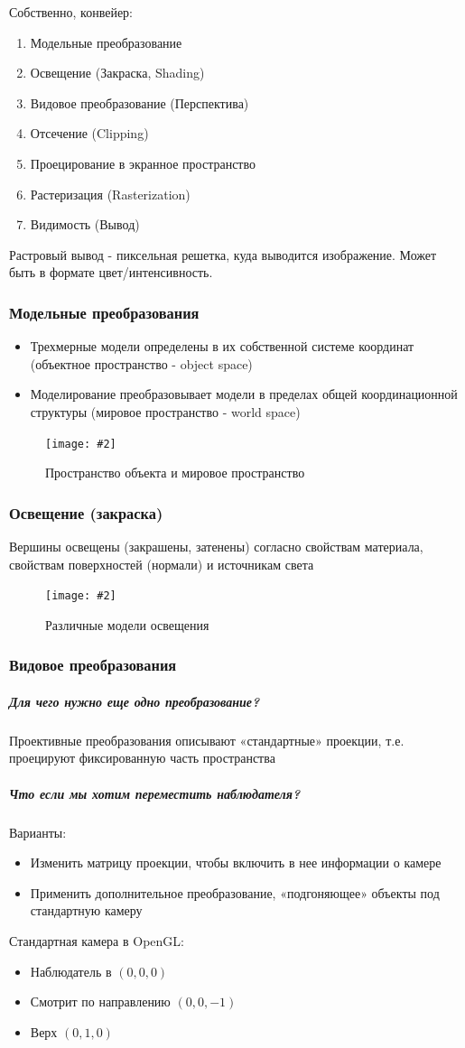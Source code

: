 \documentclass[a4paper, 14pt]{extarticle}
\newcommand{\screenshot}[3]{
	\begin{figure}[h]
		\centering
		\texttt{[image: \#2]}
		\caption{#3}
	\end{figure}
}
\begin{document}
Собственно, конвейер:
\begin{enumerate}
	\item Модельные преобразование
	\item Освещение (Закраска, Shading)
	\item Видовое преобразование (Перспектива)
	\item Отсечение (Clipping)
	\item Проецирование в экранное пространство
	\item Растеризация (Rasterization)
	\item Видимость (Вывод)
\end{enumerate}

Растровый вывод - пиксельная решетка, куда выводится изображение. Может быть в формате цвет/интенсивность.

\subsubsection{Модельные преобразования}
\begin{itemize}
	\item Трехмерные модели определены в их собственной системе координат (объектное пространство - object space)
	\item Моделирование преобразовывает модели в пределах общей координационной структуры (мировое пространство - world space)
\end{itemize}
\screenshot{width=\textwidth}{l5/S028.jpg}{Пространство объекта и мировое пространство}

\subsubsection{Освещение (закраска)}
Вершины освещены (закрашены, затенены) согласно свойствам материала, свойствам поверхностей (нормали) и источникам света
\screenshot{width=9cm}{l5/S029.jpg}{Различные модели освещения}

\subsubsection{Видовое преобразования}
\subparagraph{Для чего нужно еще одно преобразование?}
Проективные преобразования описывают «стандартные» проекции, т.е. проецируют фиксированную часть пространства
\subparagraph{Что если мы хотим переместить наблюдателя?}
Варианты:
\begin{itemize}
	\item Изменить матрицу проекции, чтобы включить в нее информации о камере
	\item Применить дополнительное преобразование, «подгоняющее» объекты под стандартную камеру
\end{itemize}
Стандартная камера в OpenGL:
\begin{itemize}
	\item Наблюдатель в $(0, 0, 0)$
	\item Смотрит по направлению $(0, 0, -1)$
	\item Верх $(0, 1, 0)$
\end{itemize}
\end{document}
